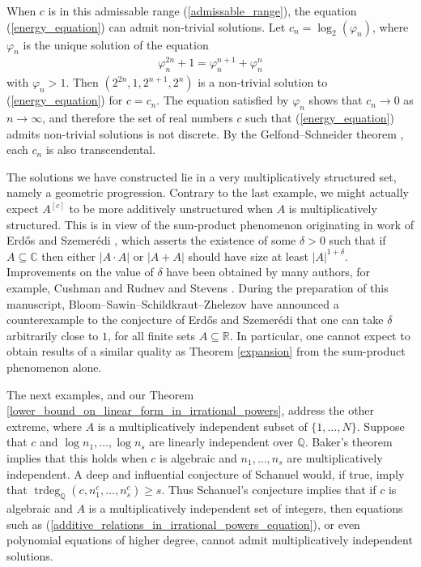 \documentclass[9pt]{amsart}
\theoremstyle{my_theorem_style}
\numberwithin{definition}{section}
\newcommand{\C}{\mathbb{C}}
\renewcommand{\phi}{\varphi}
\newcommand{\Q}{\mathbb{Q}}
\newcommand{\R}{\mathbb{R}}
\DeclareMathOperator{\trdeg}{trdeg}
\begin{document}
When $c$ is in this admissable range (\ref{admissable_range}), the equation (\ref{energy_equation}) can admit non-trivial solutions. Let $c_n = \log_2(\phi_n)$, where $\phi_n$ is the unique solution of the equation
\begin{align*}
    \phi_n^{2n} + 1 = \phi_n^{n + 1} + \phi_n^n
\end{align*}
with $\phi_n > 1$. Then $(2^{2n}, 1, 2^{n + 1}, 2^n)$ is a non-trivial solution to (\ref{energy_equation}) for $c = c_n$. The equation satisfied by $\phi_n$ shows that $c_n \to 0$ as $n \to \infty$, and therefore the set of real numbers $c$ such that (\ref{energy_equation}) admits non-trivial solutions is not discrete. By the Gelfond--Schneider theorem \cite{Gelfond_on_the_seventh_problem_of_D._Hilbert, Schneider_transcendence_investigations}, each $c_n$ is also transcendental.

The solutions we have constructed lie in a very multiplicatively structured set, namely a geometric progression. Contrary to the last example, we might actually expect $A^{[c]}$ to be more additively unstructured when $A$ is multiplicatively structured. This is in view of the sum-product phenomenon originating in work of Erd\H{o}s and Szemer{\' e}di \cite{Erdos--Szemeredi_on_sums_and_products_of_integers}, which asserts the existence of some $\delta > 0$ such that if $A \subseteq \C$ then either $|A \cdot A|$ or $|A + A|$ should have size at least $|A|^{1 + \delta}$. Improvements on the value of $\delta$ have been obtained by many authors, for example, Cushman \cite{Cushman_a_note_on_the_sum-product_problem_and_the_convex_sumset_problem} and Rudnev and Stevens \cite{Rudnev--Stevens_an_update_on_the_sum-product_problem}. During the preparation of this manuscript, Bloom--Sawin--Schildkraut--Zhelezov \cite{Bloom--Sawin--Schildkraut--Zhelezov} have announced a counterexample to the conjecture of Erd\H{o}s and Szemer{\' e}di that one can take $\delta$ arbitrarily close to $1$, for all finite sets $A \subseteq \R$. In particular, one cannot expect to obtain results of a similar quality as Theorem \ref{expansion} from the sum-product phenomenon alone.

The next examples, and our Theorem \ref{lower_bound_on_linear_form_in_irrational_powers}, address the other extreme, where $A$ is a multiplicatively independent subset of $\{1, \dots, N\}$. Suppose that $c$ and $\log{n_1}, \dots, \log{n_s}$ are linearly independent over $\Q$. Baker's theorem \cite{Baker_linear_forms_in_the_logarithms_of_algebraic_numbers} implies that this holds when $c$ is algebraic and $n_1, \dots, n_s$ are multiplicatively independent. A deep and influential conjecture of Schanuel would, if true, imply that $\trdeg_\Q(c, n_1^c, \dots, n_s^c) \geq s$. Thus Schanuel's conjecture implies that if $c$ is algebraic and $A$ is a multiplicatively independent set of integers, then equations such as (\ref{additive_relations_in_irrational_powers_equation}), or even polynomial equations of higher degree, cannot admit multiplicatively independent solutions.
\end{document}
